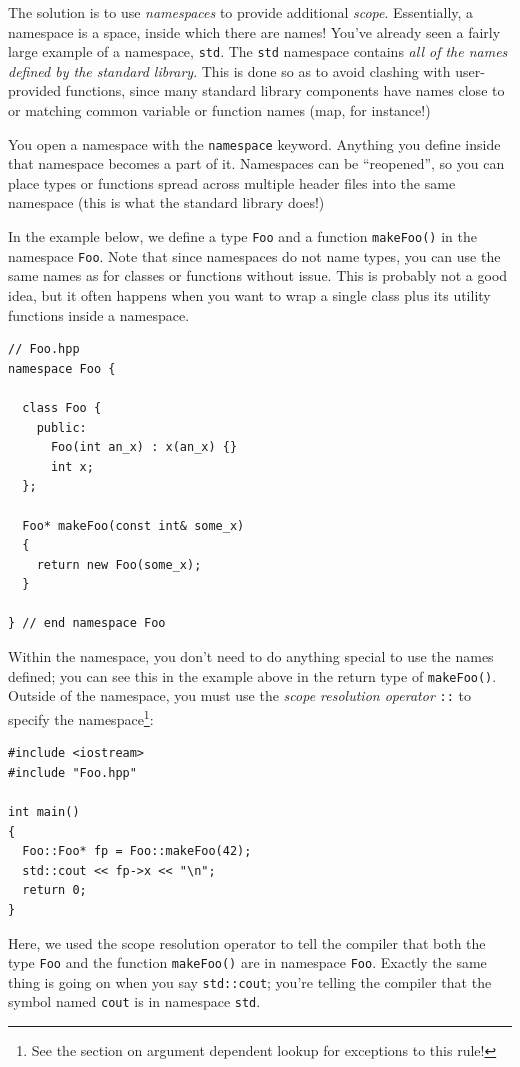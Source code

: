 \documentclass[a4paper]{scrartcl}
\begin{document}
The solution is to use \emph{namespaces} to provide additional \emph{scope}. Essentially, a namespace is a space, inside which there are names! You've already seen a fairly large example of a namespace, \verb|std|. The \verb|std| namespace contains \emph{all of the names defined by the standard library}. This is done so as to avoid clashing with user-provided functions, since many standard library components have names close to or matching common variable or function names (map, for instance!)

You open a namespace with the \verb|namespace| keyword. Anything you define inside that namespace becomes a part of it. Namespaces can be ``reopened'', so you can place types or functions spread across multiple header files into the same namespace (this is what the standard library does!)

In the example below, we define a type \verb|Foo| and a function \verb|makeFoo()| in the namespace \verb|Foo|. Note that since namespaces do not name types, you can use the same names as for classes or functions without issue. This is probably not a good idea, but it often happens when you want to wrap a single class plus its utility functions inside a namespace.

\begin{verbatim}
// Foo.hpp
namespace Foo {
  
  class Foo {
    public:
      Foo(int an_x) : x(an_x) {}
      int x;
  };

  Foo* makeFoo(const int& some_x)
  {
    return new Foo(some_x);
  }

} // end namespace Foo
\end{verbatim}

Within the namespace, you don't need to do anything special to use the names defined; you can see this in the example above in the return type of \verb|makeFoo()|. Outside of the namespace, you must use the \emph{scope resolution operator} \verb|::| to specify the namespace\footnote{See the section on argument dependent lookup for exceptions to this rule!}:

\begin{verbatim}
#include <iostream>
#include "Foo.hpp"

int main()
{
  Foo::Foo* fp = Foo::makeFoo(42);
  std::cout << fp->x << "\n";
  return 0;
}
\end{verbatim}

Here, we used the scope resolution operator to tell the compiler that both the type \verb|Foo| and the function \verb|makeFoo()| are in namespace \verb|Foo|. Exactly the same thing is going on when you say \verb|std::cout|; you're telling the compiler that the symbol named \verb|cout| is in namespace \verb|std|.
\end{document}

